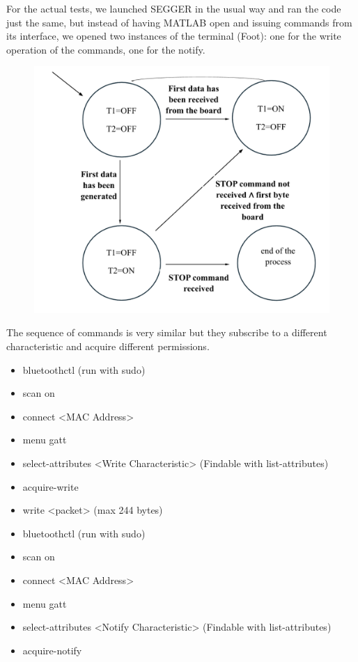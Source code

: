 \documentclass{Configuration_Files/PoliMi3i_thesis}
\begin{document}
For the actual tests, we launched SEGGER in the usual way and ran the code just the same, but instead of having MATLAB open and issuing commands from its interface, we opened two instances of the terminal (Foot): one for the write operation of the commands, one for the notify.

\begin{figure}[H]
    \centering
    \includegraphics[scale=0.7]{Board_Windows_PC/11.png}
    \label{fig:state_machine_2}
\end{figure}

The sequence of commands is very similar but they subscribe to a different characteristic and acquire different permissions.

\begin{itemize}
	\item bluetoothctl (run with sudo)\
	\item scan on
	\item connect <MAC Address>
	\item menu gatt
	\item select-attributes <Write Characteristic> (Findable with list-attributes)
	\item acquire-write
	\item write <packet> (max 244 bytes)
\end{itemize}

\begin{itemize}
	\item bluetoothctl (run with sudo)\
	\item scan on
	\item connect <MAC Address>
	\item menu gatt
	\item select-attributes <Notify Characteristic> (Findable with list-attributes)
	\item acquire-notify
\end{itemize}
\end{document}
